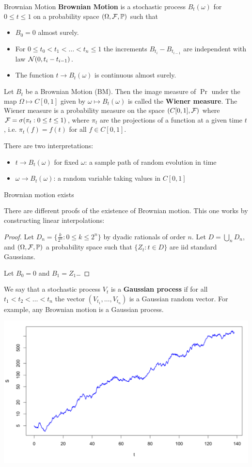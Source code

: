 \documentclass[../chapter01.tex]{subfile}
\begin{document}
\begin{Definition}{Brownian Motion}
{\bf Brownian Motion} is a stochastic process $B_t(\omega)$ for $0\le t \le 1$ on a probability space $(\Omega, \mathcal{F}, \mathbb{P})$ such that 
\begin{itemize}
  \item $B_0 = 0$ almost surely.
  \item For $0\le t_0 < t_1 < \ldots < t_n \le 1$ the increments $B_{t_i} - B_{t_{i-1}}$ are independent with law $\mathcal{N}(0, t_{i}-t_{i-1})$.
  \item The function $t \to B_t(\omega)$ is continuous almost surely.
\end{itemize}
\end{Definition}

Let $B_t$ be a Brownian Motion (BM). Then the image measure of $\Pr$ under the map $\Omega\mapsto C[0, 1]$ given by $\omega \mapsto B_{t}(\omega)$ is called the {\bf Wiener measure}.
The Wiener measure is a probability measure on the space $(C[0, 1], \mathcal{F})$ where $\mathcal{F} = \sigma(\pi_t: 0 \le t \le 1)$, where $\pi_t$ are the projections of a 
function at a given time $t$, i.e. $\pi_t(f) = f(t)$ for all $f \in C[0, 1]$. 

There are two interpretations:
\begin{itemize}
  \item $t \to B_t(\omega)$ for fixed $\omega$: a sample path of random evolution in time
  \item $\omega \to B_t(\omega)$: a random variable taking values in $C[0, 1]$
\end{itemize}

\begin{proposition}
Brownian motion exists
\end{proposition}

There are different proofs of the existence of Brownian motion. This one works by constructing linear interpolations:
\begin{proof}
Let $D_n = \{\frac{k}{2^n} : 0 \le k \le 2^{n}\}$ by dyadic rationals of order $n$. Let $D = \bigcup_n D_n$, and $(\Omega, \mathcal{F}, \mathbb{P})$ a probability space such that $\{Z_{t}: t\in D\}$ are iid 
standard Gaussians. 

Let $B_0 = 0$ and $B_1 = Z_1$\ldots   
\end{proof}

We say that a stochastic process $V_t$ is a {\bf Gaussian process} if for all $t_1 < t_2 <\ldots < t_{n}$ the vector $(V_{t_1},\ldots, V_{t_n})$ is a Gaussian random vector. 
For example, any Brownian motion is a Gaussian process. 

\begin{Figure}
\includegraphics{./figures/BM.svg}
\caption{Example Brownian Motion Path}
\end{Figure}
\end{document}
